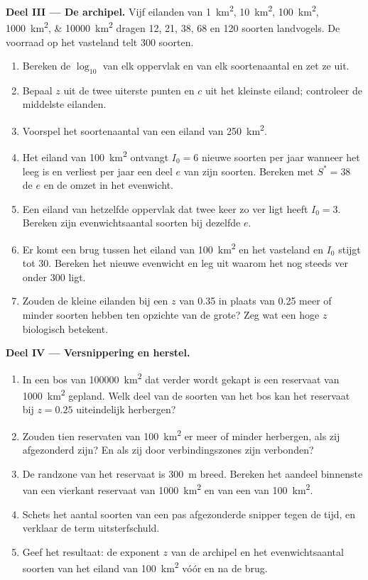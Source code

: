 \begin{problem}
\medskip
\noindent\textbf{Deel III --- De archipel.}
Vijf eilanden van \qtylist{1;10;100;1000;10000}{km^2} dragen \num{12}, \num{21}, \num{38}, \num{68} en
\num{120} soorten landvogels. De voorraad op het vasteland telt \num{300}
soorten.
\begin{enumerate}[resume]
  \item Bereken de $\log_{10}$ van elk oppervlak en van elk
        soortenaantal en zet ze uit.
  \item Bepaal $z$ uit de twee uiterste punten en $c$ uit het kleinste
        eiland; controleer de middelste eilanden.
  \item Voorspel het soortenaantal van een eiland van \qty{250}{km^2}.
  \item Het eiland van \qty{100}{km^2} ontvangt $I_0 = 6$ nieuwe soorten
        per jaar wanneer het leeg is en verliest per jaar een deel $e$
        van zijn soorten. Bereken met $S^* = 38$ de $e$ en de omzet in
        het evenwicht.
  \item Een eiland van hetzelfde oppervlak dat twee keer zo ver ligt heeft
        $I_0 = 3$. Bereken zijn evenwichtsaantal soorten bij dezelfde $e$.
  \item Er komt een brug tussen het eiland van \qty{100}{km^2} en het
        vasteland en $I_0$ stijgt tot \num{30}. Bereken het nieuwe
        evenwicht en leg uit waarom het nog steeds ver onder \num{300}
        ligt.
  \item Zouden de kleine eilanden bij een $z$ van \num{0.35} in plaats van
        \num{0.25} meer of minder soorten hebben ten opzichte van de
        grote? Zeg wat een hoge $z$ biologisch betekent.
\end{enumerate}

\medskip
\noindent\textbf{Deel IV --- Versnippering en herstel.}
\begin{enumerate}[resume]
  \item In een bos van \qty{100000}{km^2} dat verder wordt gekapt is een
        reservaat van \qty{1000}{km^2} gepland. Welk deel van de soorten
        van het bos kan het reservaat bij $z =
        0.25$ uiteindelijk herbergen?
  \item Zouden tien reservaten van \qty{100}{km^2} er meer of minder
        herbergen, als zij afgezonderd zijn? En als zij door
        verbindingszones zijn verbonden?
  \item De randzone van het reservaat is \qty{300}{m} breed. Bereken het
        aandeel binnenste van een vierkant reservaat van \qty{1000}{km^2}
        en van een van \qty{100}{km^2}.
  \item Schets het aantal soorten van een pas afgezonderde snipper tegen
        de tijd, en verklaar de term uitsterfschuld.
  \item Geef het resultaat: de exponent $z$ van de archipel en het
        evenwichtsaantal soorten van het eiland van \qty{100}{km^2} vóór
        en na de brug.
\end{enumerate}
\end{problem}
